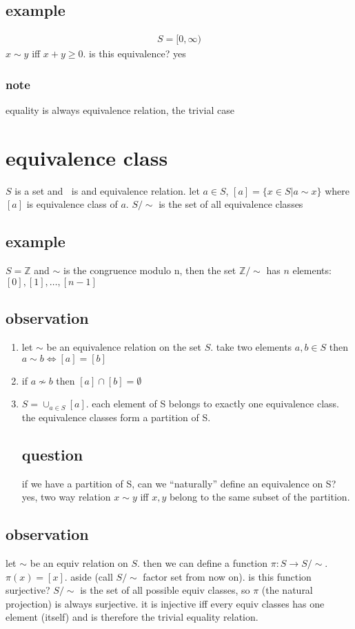 \documentclass[letterpaper]{article}
\begin{document}
\subsection*{example}
\begin{align*}
  S=[0,\infty)
\end{align*}
$x\sim y$ iff $x+y\ge 0$. is this equivalence? yes

\subsubsection*{note}
equality  is always equivalence relation, the trivial case

\section*{equivalence class}
$S$ is a set and $~$ is and equivalence relation. let $a\in S$, $[a]=\{x\in S|a\sim x\}$ where $[a]$ is equivalence class of $a$. $S/\sim$ is the set of all equivalence classes
\subsection*{example}
$S=\mathbb{Z}$ and $\sim$ is the congruence modulo n, then the set $\mathbb{Z}/\sim$ has $n$ elements: $[0],[1],\dots,[n-1]$
\subsection*{observation}
\begin{enumerate}
\item

let $\sim$ be an equivalence relation on the set $S$. take two elements $a,b\in S$ then $a\sim b\Leftrightarrow [a]=[b]$
\item
if $a\not\sim b$ then $[a]\cap[b]=\emptyset$
\item
$S=\cup_{a\in S}[a]$. each element of S belongs to exactly one equivalence class. the equivalence classes form a partition of S.
\subsection*{question}
if we have a partition of S, can we ``naturally'' define an equivalence on S? yes, two way relation $x\sim y$ iff $x,y$ belong to the same subset of the partition.
\end{enumerate}
\subsection*{observation}
let $\sim$ be an equiv relation on $S$. then we can define a function $\pi:S\to S/\sim$. $\pi(x)=[x]$. aside (call $S/\sim$ factor set from now on). is this function surjective? $S/\sim$ is the set of all possible equiv classes, so $\pi$ (the natural projection) is always surjective. it is injective iff every equiv classes has one element (itself) and is therefore the trivial equality relation.
\end{document}

